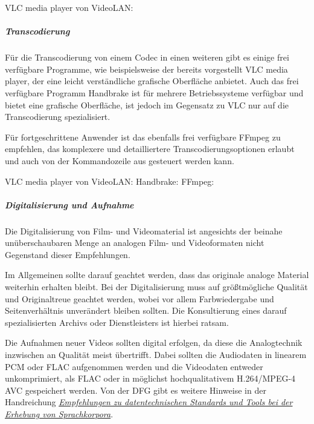 \begin{flushleft}
	VLC media player von VideoLAN: 
\end{flushleft}

\subparagraph{Transcodierung} Für die Transcodierung von einem Codec in einen weiteren gibt es einige frei verfügbare Programme, wie beispielsweise der bereits vorgestellt VLC media player, der eine leicht verständliche grafische Oberfläche anbietet. Auch das frei verfügbare Programm Handbrake ist für mehrere Betriebssysteme verfügbar und bietet eine grafische Oberfläche, ist jedoch im Gegensatz zu VLC nur auf die Transcodierung spezialisiert.

Für fortgeschrittene Anwender ist das ebenfalls frei verfügbare FFmpeg zu empfehlen, das komplexere und detailliertere Transcodierungsoptionen erlaubt und auch von der Kommandozeile aus gesteuert werden kann. 

\begin{flushleft}
	VLC media player von VideoLAN: 
	Handbrake: 
	FFmpeg: 
\end{flushleft}


\subparagraph{Digitalisierung und Aufnahme} Die Digitalisierung von Film- und Videomaterial ist angesichts der beinahe unüberschaubaren Menge an analogen Film- und Videoformaten nicht Gegenstand dieser Empfehlungen. 

Im Allgemeinen sollte darauf geachtet werden, dass das originale analoge Material weiterhin erhalten bleibt. Bei der Digitalisierung muss auf größtmögliche Qualität und Originaltreue geachtet werden, wobei vor allem Farbwiedergabe und Seitenverhältnis unverändert bleiben sollten. Die Konsultierung eines darauf spezialisierten Archivs oder Dienstleisters ist hierbei ratsam.

Die Aufnahmen neuer Videos sollten digital erfolgen, da diese die Analogtechnik inzwischen an Qualität meist übertrifft. Dabei sollten die Audiodaten in linearem PCM oder FLAC aufgenommen werden und die Videodaten entweder unkomprimiert, als FLAC oder in möglichst hochqualitativem H.264/MPEG-4 AVC gespeichert werden. Von der DFG gibt es weitere Hinweise in der Handreichung \href{http://www.dfg.de/download/pdf/foerderung/grundlagen_dfg_foerderung/informationen_fachwissenschaften/geisteswissenschaften/standards_sprachkorpora.pdf}{\emph{Empfehlungen zu datentechnischen Standards und Tools bei der Erhebung von Sprachkorpora}}.


